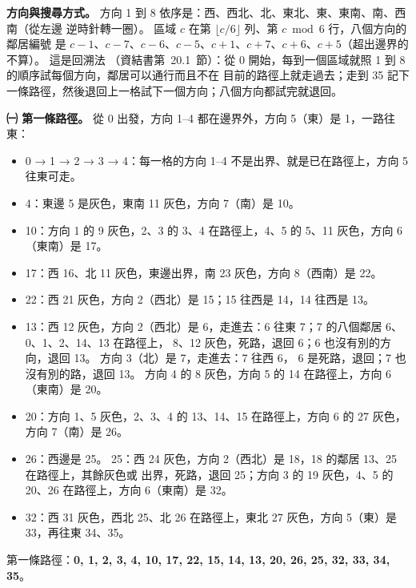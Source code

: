 \begin{pastsoln}
\textbf{方向與搜尋方式。} 方向 1 到 8 依序是：西、西北、北、東北、東、東南、南、西南（從左邊
逆時針轉一圈）。 區域 $c$ 在第 $\lfloor c/6 \rfloor$ 列、第 $c \bmod 6$ 行，八個方向的鄰居編號
是 $c-1$、$c-7$、$c-6$、$c-5$、$c+1$、$c+7$、$c+6$、$c+5$（超出邊界的不算）。 這是回溯法
（資結書第~20.1~節）：從 0 開始，每到一個區域就照 1 到 8 的順序試每個方向，鄰居可以通行而且不在
目前的路徑上就走過去；走到 35 記下一條路徑，然後退回上一格試下一個方向；八個方向都試完就退回。

\textbf{㈠ 第一條路徑。} 從 0 出發，方向 1--4 都在邊界外，方向 5（東）是 1，一路往東：
\begin{itemize}
\item 0 → 1 → 2 → 3 → 4：每一格的方向 1--4 不是出界、就是已在路徑上，方向 5 往東可走。
\item 4：東邊 5 是灰色，東南 11 灰色，方向 7（南）是 10。
\item 10：方向 1 的 9 灰色，2、3 的 3、4 在路徑上，4、5 的 5、11 灰色，方向 6（東南）是 17。
\item 17：西 16、北 11 灰色，東邊出界，南 23 灰色，方向 8（西南）是 22。
\item 22：西 21 灰色，方向 2（西北）是 15；15 往西是 14，14 往西是 13。
\item 13：西 12 灰色，方向 2（西北）是 6，走進去：6 往東 7；7 的八個鄰居 6、0、1、2、14、13 在路徑上，
8、12 灰色，死路，退回 6；6 也沒有別的方向，退回 13。 方向 3（北）是 7，走進去：7 往西 6，
6 是死路，退回；7 也沒有別的路，退回 13。 方向 4 的 8 灰色，方向 5 的 14 在路徑上，方向 6
（東南）是 20。
\item 20：方向 1、5 灰色，2、3、4 的 13、14、15 在路徑上，方向 6 的 27 灰色，方向 7（南）是 26。
\item 26：西邊是 25。 25：西 24 灰色，方向 2（西北）是 18，18 的鄰居 13、25 在路徑上，其餘灰色或
出界，死路，退回 25；方向 3 的 19 灰色，4、5 的 20、26 在路徑上，方向 6（東南）是 32。
\item 32：西 31 灰色，西北 25、北 26 在路徑上，東北 27 灰色，方向 5（東）是 33，再往東 34、35。
\end{itemize}
第一條路徑：\textbf{0, 1, 2, 3, 4, 10, 17, 22, 15, 14, 13, 20, 26, 25, 32, 33, 34, 35}。


\end{pastsoln}
